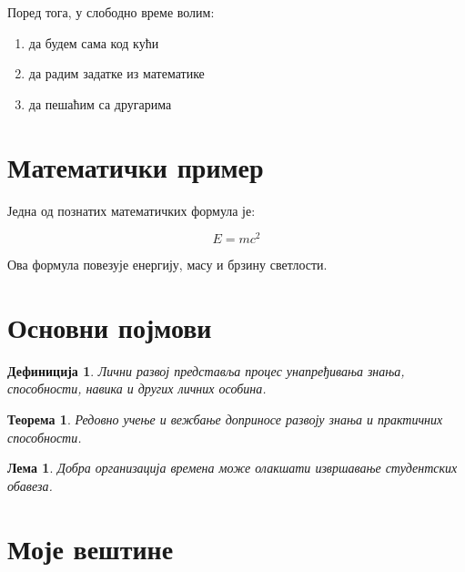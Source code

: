 \documentclass[12pt,a4paper]{article}
\newtheorem{definition}{Дефиниција}
\newtheorem{theorem}{Теорема}
\newtheorem{lemma}{Лема}
\begin{document}
Поред тога, у слободно време волим:

\begin{enumerate}
    \item да будем сама код кући
    \item да радим задатке из математике
    \item да пешаћим са другарима
\end{enumerate}



\section{Математички пример}

Једна од познатих математичких формула је:

\[
E = mc^2
\]

Ова формула повезује енергију, масу и брзину светлости.



\section{Основни појмови}

\begin{definition}

Лични развој представља процес унапређивања
знања, способности, навика и других личних особина.

\end{definition}



\begin{theorem}

Редовно учење и вежбање доприносе развоју
знања и практичних способности.

\end{theorem}



\begin{lemma}

Добра организација времена може олакшати
извршавање студентских обавеза.

\end{lemma}



\section{Моје вештине}
\end{document}
